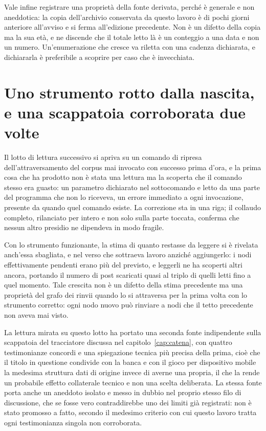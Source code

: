 Vale infine registrare una proprietà della fonte derivata, perché è generale e non aneddotica: la copia dell'archivio conservata da questo lavoro è di pochi giorni anteriore all'avviso e si ferma all'edizione precedente. Non è un difetto della copia ma la sua età, e ne discende che il totale letto là è un conteggio a una data e non un numero. Un'enumerazione che cresce va riletta con una cadenza dichiarata, e dichiararla è preferibile a scoprire per caso che è invecchiata.

\section{Uno strumento rotto dalla nascita, e una scappatoia corroborata due volte}

Il lotto di lettura successivo si apriva su un comando di ripresa dell'attraversamento del corpus mai invocato con successo prima d'ora, e la prima cosa che ha prodotto non è stata una lettura ma la scoperta che il comando stesso era guasto: un parametro dichiarato nel sottocomando e letto da una parte del programma che non lo riceveva, un errore immediato a ogni invocazione, presente da quando quel comando esiste. La correzione sta in una riga; il collaudo completo, rilanciato per intero e non solo sulla parte toccata, conferma che nessun altro presidio ne dipendeva in modo fragile.

Con lo strumento funzionante, la stima di quanto restasse da leggere si è rivelata anch'essa sbagliata, e nel verso che sottraeva lavoro anziché aggiungerlo: i nodi effettivamente pendenti erano più del previsto, e leggerli ne ha scoperti altri ancora, portando il numero di post scaricati quasi al triplo di quelli letti fino a quel momento. Tale crescita non è un difetto della stima precedente ma una proprietà del grafo dei rinvii quando lo si attraversa per la prima volta con lo strumento corretto: ogni nodo nuovo può rinviare a nodi che il tetto precedente non aveva mai visto.

La lettura mirata su questo lotto ha portato una seconda fonte indipendente sulla scappatoia del tracciatore discussa nel capitolo~\ref{cap:catena}, con quattro testimonianze concordi e una spiegazione tecnica più precisa della prima, cioè che il titolo in questione condivide con la banca e con il gioco per dispositivo mobile la medesima struttura dati di origine invece di averne una propria, il che la rende un probabile effetto collaterale tecnico e non una scelta deliberata. La stessa fonte porta anche un aneddoto isolato e messo in dubbio nel proprio stesso filo di discussione, che se fosse vero contraddirebbe uno dei limiti già registrati: non è stato promosso a fatto, secondo il medesimo criterio con cui questo lavoro tratta ogni testimonianza singola non corroborata.

